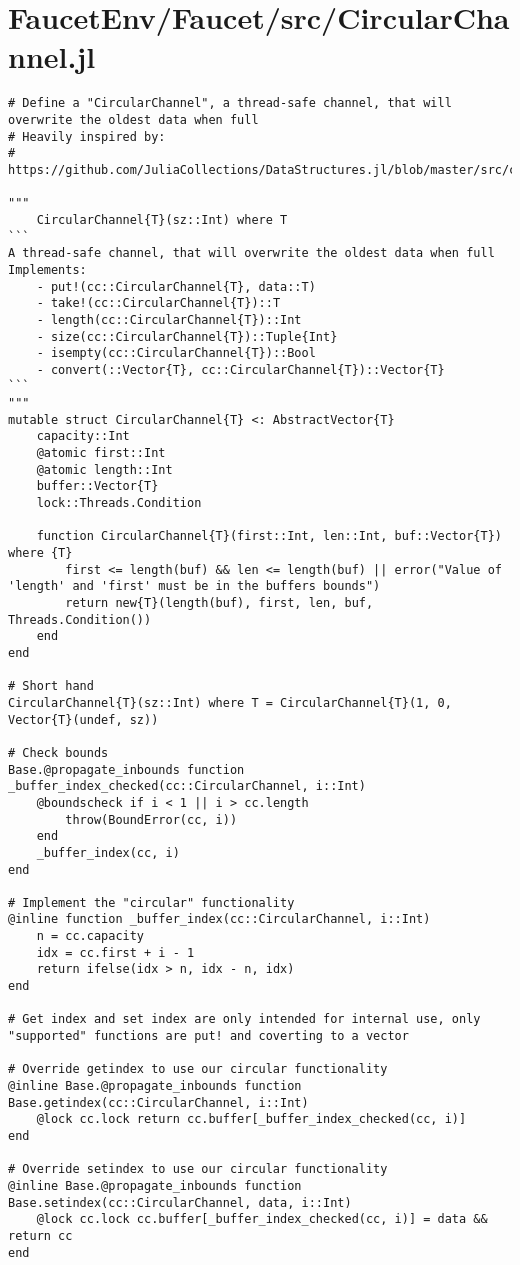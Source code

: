 \section{FaucetEnv/Faucet/src/CircularChannel.jl}
\begin{lstlisting}[language=JuliaLocal, style=julia]
# Define a "CircularChannel", a thread-safe channel, that will overwrite the oldest data when full
# Heavily inspired by:
# https://github.com/JuliaCollections/DataStructures.jl/blob/master/src/circular_buffer.jl

"""
    CircularChannel{T}(sz::Int) where T
```
A thread-safe channel, that will overwrite the oldest data when full
Implements:
    - put!(cc::CircularChannel{T}, data::T)
    - take!(cc::CircularChannel{T})::T
    - length(cc::CircularChannel{T})::Int
    - size(cc::CircularChannel{T})::Tuple{Int}
    - isempty(cc::CircularChannel{T})::Bool
    - convert(::Vector{T}, cc::CircularChannel{T})::Vector{T}
```
"""
mutable struct CircularChannel{T} <: AbstractVector{T}
    capacity::Int
    @atomic first::Int
    @atomic length::Int
    buffer::Vector{T}
    lock::Threads.Condition

    function CircularChannel{T}(first::Int, len::Int, buf::Vector{T}) where {T}
        first <= length(buf) && len <= length(buf) || error("Value of 'length' and 'first' must be in the buffers bounds")
        return new{T}(length(buf), first, len, buf, Threads.Condition())
    end
end

# Short hand
CircularChannel{T}(sz::Int) where T = CircularChannel{T}(1, 0, Vector{T}(undef, sz))

# Check bounds
Base.@propagate_inbounds function _buffer_index_checked(cc::CircularChannel, i::Int)
    @boundscheck if i < 1 || i > cc.length
        throw(BoundError(cc, i))
    end
    _buffer_index(cc, i)
end

# Implement the "circular" functionality
@inline function _buffer_index(cc::CircularChannel, i::Int)
    n = cc.capacity
    idx = cc.first + i - 1
    return ifelse(idx > n, idx - n, idx)
end

# Get index and set index are only intended for internal use, only "supported" functions are put! and coverting to a vector

# Override getindex to use our circular functionality
@inline Base.@propagate_inbounds function Base.getindex(cc::CircularChannel, i::Int)
    @lock cc.lock return cc.buffer[_buffer_index_checked(cc, i)]
end

# Override setindex to use our circular functionality
@inline Base.@propagate_inbounds function Base.setindex(cc::CircularChannel, data, i::Int)
    @lock cc.lock cc.buffer[_buffer_index_checked(cc, i)] = data && return cc
end


\end{lstlisting}
